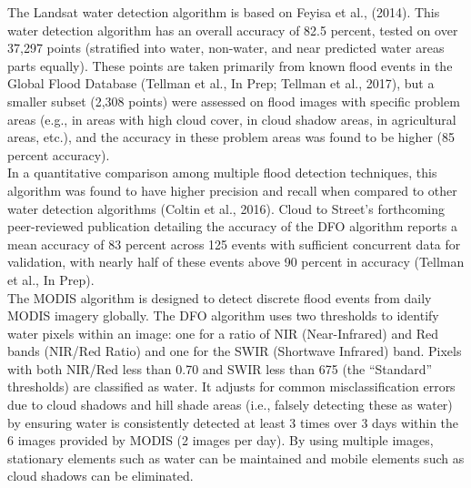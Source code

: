 The Landsat water detection algorithm is based on Feyisa et al., (2014)\cite{feyisa2014automated}. This water detection algorithm has an overall accuracy of 82.5 percent, tested on over 37,297 points (stratified into water, non-water, and near predicted water areas parts equally). These points are taken primarily from known flood events in the Global Flood Database (Tellman et al., In Prep; Tellman et al., 2017\cite{tellman2017global}), but a smaller subset (2,308 points) were assessed on flood images with specific problem areas (e.g., in areas with high cloud cover, in cloud shadow areas, in agricultural areas, etc.), and the accuracy in these problem areas was found to be higher (85 percent accuracy).\\

In a quantitative comparison among multiple flood detection techniques, this algorithm was found to have higher precision and recall when compared to other water detection algorithms (Coltin et al., 2016)\cite{coltin2016automatic}. Cloud to Street’s forthcoming peer-reviewed publication detailing the accuracy of the DFO algorithm reports a mean accuracy of 83 percent across 125 events with sufficient concurrent data for validation, with nearly half of these events above 90 percent in accuracy (Tellman et al., In Prep).\\

The MODIS algorithm is designed to detect discrete flood events from daily MODIS imagery globally. The DFO algorithm uses two thresholds to identify water pixels within an image: one for a ratio of NIR (Near-Infrared) and Red bands (NIR/Red Ratio) and one for the SWIR (Shortwave Infrared) band. Pixels with both NIR/Red less than 0.70 and SWIR less than 675 (the “Standard” thresholds) are classified as water. It adjusts for common misclassification errors due to cloud shadows and hill shade areas (i.e., falsely detecting these as water) by ensuring water is consistently detected at least 3 times over 3 days within the 6 images provided by MODIS (2 images per day). By using multiple images, stationary elements such as water can be maintained and mobile elements such as cloud shadows can be eliminated. 
